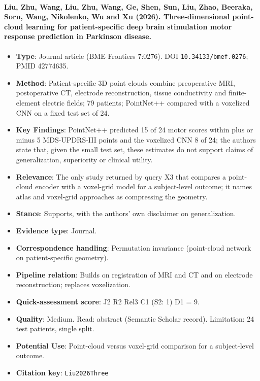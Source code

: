 \documentclass[journal,onecolumn]{IEEEtran}
\begin{document}
\paragraph{Liu, Zhu, Wang, Liu, Zhu, Wang, Ge, Shen, Sun, Liu, Zhao, Beeraka, Sorn, Wang, Nikolenko, Wu and Xu (2026). Three-dimensional point-cloud learning for patient-specific deep brain stimulation motor response prediction in Parkinson disease.~\cite{Liu2026Three}}\mbox{}

\begin{itemize}

\item{} \textbf{Type}: Journal article (BME Frontiers 7:0276). DOI \nolinkurl{10.34133/bmef.0276}; PMID 42774635.

\item{} \textbf{Method}: Patient-specific 3D point clouds combine preoperative MRI, postoperative CT, electrode reconstruction, tissue conductivity and finite-element electric fields; 79 patients; PointNet++ compared with a voxelized CNN on a fixed test set of 24.

\item{} \textbf{Key Findings}: PointNet++ predicted 15 of 24 motor scores within plus or minus 5 MDS-UPDRS-III points and the voxelized CNN 8 of 24; the authors state that, given the small test set, these estimates do not support claims of generalization, superiority or clinical utility.

\item{} \textbf{Relevance}: The only study returned by query X3 that compares a point-cloud encoder with a voxel-grid model for a subject-level outcome; it names atlas and voxel-grid approaches as compressing the geometry.

\item{} \textbf{Stance}: Supports, with the authors' own disclaimer on generalization.

\item{} \textbf{Evidence type}: Journal.

\item{} \textbf{Correspondence handling}: Permutation invariance (point-cloud network on patient-specific geometry).

\item{} \textbf{Pipeline relation}: Builds on registration of MRI and CT and on electrode reconstruction; replaces voxelization.

\item{} \textbf{Quick-assessment score}: J2 R2 Rel3 C1 (S2: 1) D1 = 9.

\item{} \textbf{Quality}: Medium. Read: abstract (Semantic Scholar record). Limitation: 24 test patients, single split.

\item{} \textbf{Potential Use}: Point-cloud versus voxel-grid comparison for a subject-level outcome.

\item{} \textbf{Citation key}: \texttt{Liu2026Three}

\end{itemize}
\end{document}
